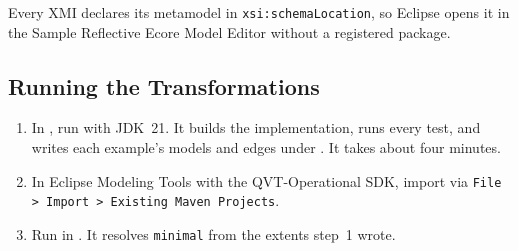Every XMI declares its metamodel in \texttt{xsi:schemaLocation}, so Eclipse
opens it in the Sample Reflective Ecore Model Editor without a registered
package.

\subsection{Running the Transformations}
\label{app:running}

\begin{enumerate}
  \item In , run  with
  JDK~21. It builds the implementation, runs every test, and writes each
  example's models and edges under
  . It takes about four minutes.
  \item In Eclipse Modeling Tools with the QVT-Operational SDK, import
   via \texttt{File > Import > Existing Maven
  Projects}.
  \item Run  in
  . It resolves \texttt{minimal}
  from the extents step~1 wrote.
\end{enumerate}
